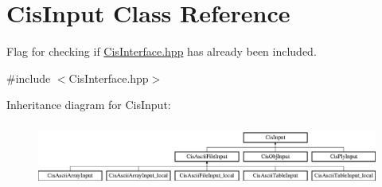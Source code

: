\hypertarget{classCisInput}{}\section{Cis\+Input Class Reference}
\label{classCisInput}


Flag for checking if \mbox{\hyperlink{CisInterface_8hpp_source}{Cis\+Interface.\+hpp}} has already been included.  




{\ttfamily \#include $<$Cis\+Interface.\+hpp$>$}

Inheritance diagram for Cis\+Input\+:\begin{figure}[H]
\begin{center}
\leavevmode
\includegraphics[height=2.100000cm]{classCisInput}
\end{center}
\end{figure}
